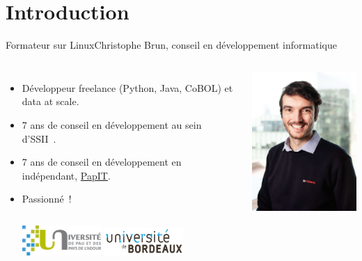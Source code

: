 \documentclass{beamer}
\begin{document}
    \section{Introduction}\label{sec:introduction}

    \begin{frame}{Formateur sur Linux}{Christophe Brun, conseil en développement informatique}

        \begin{columns}
            \begin{itemize}
                \item Développeur freelance (Python, Java, CoBOL) et data at scale.

                \item 7 ans de conseil en développement au sein d'SSII~.

                \item 7 ans de conseil en développement en indépendant, \href{https://papit.fr}{PapIT}.

                \item Passionné~!
                \bigbreak
                \begin{columns}
                    \centering
                    \includegraphics[width=3cm]{image/logo-uppa}
                    \centering
                    \includegraphics[width=3cm]{image/logo-universite-bordeaux}
                \end{columns}
            \end{itemize}
            \centering
            \includegraphics[width=5cm]{image/trombine-christophe}
        \end{columns}
    \end{frame}
\end{document}

